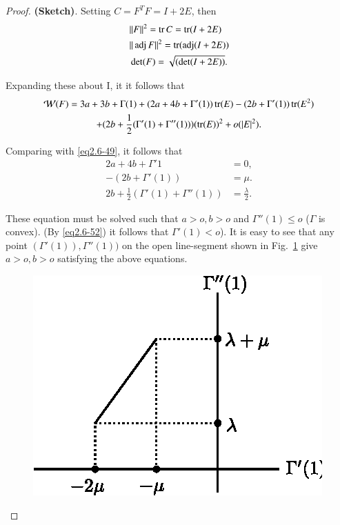 \begin{proof}
  \textbf{(Sketch)}. Setting $C=F^TF=I+2 E$, then 
  \begin{align*}
    & \| F \| ^2 =\operatorname{tr} C=\operatorname{tr} (I+2 E)\\
    & \| \operatorname{adj}  F \| ^2 =\operatorname{tr} (\operatorname{adj}  (I+2 E))\\
    & \det (F)= \sqrt{(\det (I+2E))}. 
  \end{align*}
  
  Expanding these about I, it it follows that
  \begin{multline*}
    \mathcal{W}(F)=  3a + 3b + \Gamma (1)+(2a + 4b + \Gamma '(1)) \operatorname{tr} (E)
    -(2b +\Gamma ' (1)) \operatorname{tr} (E^2)\\
    + (2b + \frac{1}{2}(\Gamma '(1)+ \Gamma'' (1 )))(\operatorname{tr} (E))^2
    + o(|E|^2 ). 
  \end{multline*}
  
  Comparing with \eqref{eq2.6-49}, it follows that 
  \begin{align*}
    2a + 4b + \Gamma '{1}& =0, \tag{2.6-52}\label{eq2.6-52}\\
    - (2b + \Gamma '(1)) & = \mu. \tag{2.6-53}\label{eq2.6-53}\\
    2b + \frac{1}{2}(\Gamma' (1)+ \Gamma'' (1)) & =
    \frac{\lambda}{2}. \tag{2.6-54}\label{eq2.6-54} 
  \end{align*}\pageoriginale
  
  These equation must be solved such that $a> o, b>o$ and $\Gamma''(1)
  \leq o$ ($\Gamma$ is convex). (By \eqref{eq2.6-52}) it follows that $\Gamma'
  (1)<o$). It is easy to see that any point $(\Gamma'(1)), \Gamma
  ''(1))$ on the open line-segment shown in Fig.~\ref{fig2.6.1} give $a> o,
  b>o$ satisfying the above equations.  

\setcounter{figure}{0}
\begin{figure}[H]
\centering
\includegraphics{vol71-figures/fig2.6-1.eps}
\medskip
\caption{}\label{fig2.6.1}
\end{figure}


\end{proof}

